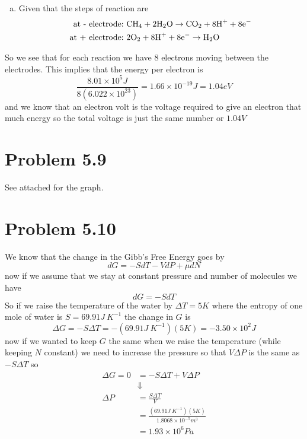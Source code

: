\documentclass[11pt]{article}
\numberwithin{equation}{section}
\begin{document}
\begin{enumerate}[(a)]
\item
Given that the steps of reaction are
\begin{align*}
\textnormal{at - electrode:}& \ \textnormal{CH}_4+2\textnormal{H}_2\textnormal{O}\rightarrow\textnormal{CO}_2+8\textnormal{H}^++8\textnormal{e}^-\\
\textnormal{at + electrode:}& \ 2\textnormal{O}_2 + 8\textnormal{H}^+ + 8\textnormal{e}^- \rightarrow\textnormal{H}_2\textnormal{O}
\end{align*}
\end{enumerate}
So we see that for each reaction we have 8 electrons moving between the electrodes. This implies that the energy per electron is 
$$\frac{8.01\times10^{5}\unit{J}}{8(6.022\times10^{23})} = 1.66\times10^{-19}\unit{J} = 1.04\unit{eV}$$
and we know that an electron volt is the voltage required to give an electron that much energy so the total voltage is just the same number or $1.04\unit{V}$

\section{Problem 5.9}
See attached for the graph.

\section{Problem 5.10}
We know that the change in the Gibb's Free Energy goes by
$$dG = -SdT-VdP+\mu dN$$
now if we assume that we stay at constant pressure and number of molecules we have
$$dG = -SdT$$
So if we raise the temperature of the water by $\Delta T =5\unit{K}$ where the entropy of one mole of water is $S = 69.91\unit{J\ K^{-1}}$ the change in $G$ is
$$\Delta G = -S\Delta T = -(69.91\unit{J\ K^{-1}})(5\unit{K}) = -3.50\times10^{2}\unit{J}$$
now if we wanted to keep $G$ the same when we raise the temperature (while keeping $N$ constant) we need to increase the pressure so that $V\Delta P$ is the same as $-S\Delta T$ so
\begin{align*}
\Delta G = 0 &= -S\Delta T + V\Delta P\\
&\Downarrow\\
\Delta P &= \frac{S\Delta T}{V}\\ 
&= \frac{(69.91\unit{J\ K^{-1}})(5\unit{K})}{1.8068\times10^{-5}\unit{m^3}}\\ 
&= 1.93\times10^{6}\unit{Pa}
\end{align*}
\end{document}
